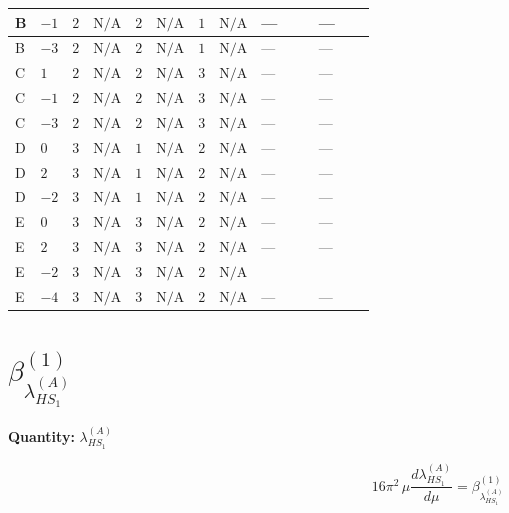 \documentclass[8pt]{article}
\begin{document}
\begin{landscape}
\begin{longtable}{@{}llcccccc >{\raggedright\arraybackslash}p{0.21\linewidth} >{\raggedright\arraybackslash}p{0.21\linewidth}@{}}
\midrule
B & $-1$ & $2$ & $\text{N/A}$ & $2$ & $\text{N/A}$ & $1$ & $\text{N/A}$ & --- & --- \\
\midrule
B & $-3$ & $2$ & $\text{N/A}$ & $2$ & $\text{N/A}$ & $1$ & $\text{N/A}$ & --- & --- \\
\midrule
C & $1$ & $2$ & $\text{N/A}$ & $2$ & $\text{N/A}$ & $3$ & $\text{N/A}$ & --- & --- \\
\midrule
C & $-1$ & $2$ & $\text{N/A}$ & $2$ & $\text{N/A}$ & $3$ & $\text{N/A}$ & --- & --- \\
\midrule
C & $-3$ & $2$ & $\text{N/A}$ & $2$ & $\text{N/A}$ & $3$ & $\text{N/A}$ & --- & --- \\
\midrule
D & $0$ & $3$ & $\text{N/A}$ & $1$ & $\text{N/A}$ & $2$ & $\text{N/A}$ & --- & --- \\
\midrule
D & $2$ & $3$ & $\text{N/A}$ & $1$ & $\text{N/A}$ & $2$ & $\text{N/A}$ & --- & --- \\
\midrule
D & $-2$ & $3$ & $\text{N/A}$ & $1$ & $\text{N/A}$ & $2$ & $\text{N/A}$ & --- & --- \\
\midrule
E & $0$ & $3$ & $\text{N/A}$ & $3$ & $\text{N/A}$ & $2$ & $\text{N/A}$ & --- & --- \\
\midrule
E & $2$ & $3$ & $\text{N/A}$ & $3$ & $\text{N/A}$ & $2$ & $\text{N/A}$ & --- & --- \\
\midrule
E & $-2$ & $3$ & $\text{N/A}$ & $3$ & $\text{N/A}$ & $2$ & $\text{N/A}$ & \scriptsize\adjustbox{max width=\linewidth}{$\begin{gathered} +4 {\lambda_{X_{2}}} \left({\lambda_{X_{7}}^{(2)}}\right)^{*}\end{gathered}$} & \scriptsize\adjustbox{max width=\linewidth}{$\begin{gathered} +8 {\lambda_{X_{7}}^{(1)}} \left({\lambda_{X_{7}}^{(2)}}\right)^{*}\end{gathered}$} \\
\midrule
E & $-4$ & $3$ & $\text{N/A}$ & $3$ & $\text{N/A}$ & $2$ & $\text{N/A}$ & --- & --- \\
\midrule
\bottomrule
\end{longtable}
\clearpage
\section*{$\beta_{\lambda_{HS_1}^{(A)}}^{(1)}$}
\noindent\textbf{Quantity: }$\lambda_{HS_1}^{(A)}$\par\smallskip
\[16\pi^2\,\mu\frac{d \lambda_{HS_1}^{(A)}}{d\mu}=\beta_{\lambda_{HS_1}^{(A)}}^{(1)}\]

\end{landscape}
\end{document}
